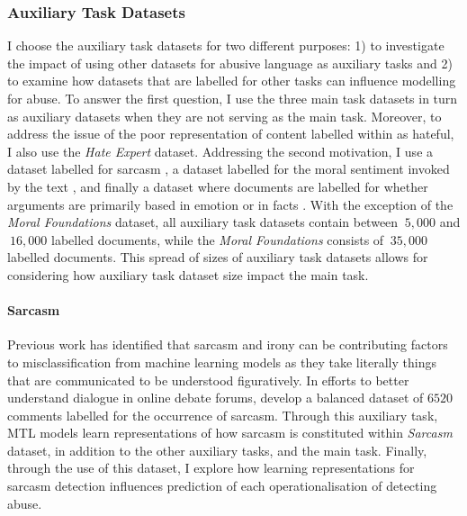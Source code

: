\subsubsection{Auxiliary Task Datasets}

I choose the auxiliary task datasets for two different purposes: 1) to investigate the impact of using other datasets for abusive language as auxiliary tasks and 2) to examine how datasets that are labelled for other tasks can influence modelling for abuse.
To answer the first question, I use the three main task datasets in turn as auxiliary datasets when they are not serving as the main task. Moreover, to address the issue of the poor representation of content labelled within as hateful, I also use the \textit{Hate Expert} dataset.
Addressing the second motivation, I use a dataset labelled for sarcasm \citep{Oraby_sarcasm:2016}, a dataset labelled for the moral sentiment invoked by the text \citep{Hoover:2019}, and finally a dataset where documents are labelled for whether arguments are primarily based in emotion or in facts \citep{Oraby_factfeel:2015}.
With the exception of the \textit{Moral Foundations} dataset, all auxiliary task datasets contain between $~5,000$ and $~16,000$ labelled documents, while the \textit{Moral Foundations} consists of $~35,000$ labelled documents.
This spread of sizes of auxiliary task datasets allows for considering how auxiliary task dataset size impact the main task.

\paragraph{Sarcasm}
Previous work \citep{Rottger:2021} has identified that sarcasm and irony can be contributing factors to misclassification from machine learning models as they take literally things that are communicated to be understood figuratively.
In efforts to better understand dialogue in online debate forums, \citet{Oraby_sarcasm:2016} develop a balanced dataset of $6520$ comments labelled for the occurrence of sarcasm.
Through this auxiliary task, MTL models learn representations of how sarcasm is constituted within \textit{Sarcasm} dataset, in addition to the other auxiliary tasks, and the main task.
Finally, through the use of this dataset, I explore how learning representations for sarcasm detection influences prediction of each operationalisation of detecting abuse.

